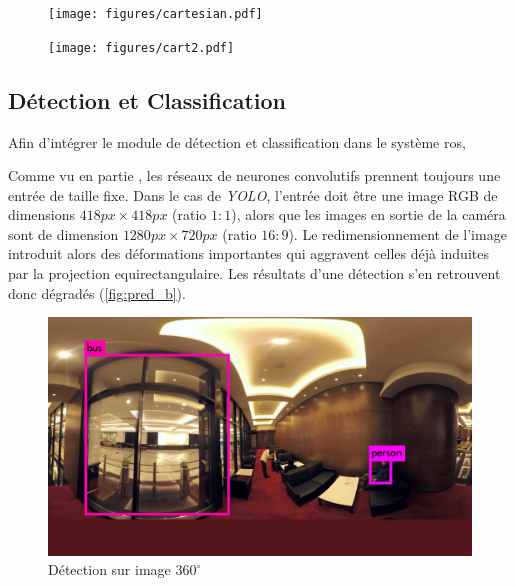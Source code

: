 			\begin{figure}[H]
				\centering
				\begin{minipage}{.5\textwidth}
					\centering
					\texttt{[image: figures/cartesian.pdf]}
					\label{fig:platlong}
				\end{minipage}%
				\begin{minipage}{.5\textwidth}
					\centering
					\texttt{[image: figures/cart2.pdf]}
					\label{fig:pequirect}
				\end{minipage}
			\end{figure}
			\par

		\subsection{Détection et Classification}
		
			Afin d'intégrer le module de détection et classification dans le système \gls{ros},
			\par
			
			Comme vu en partie \todoref, les réseaux de neurones convolutifs prennent toujours une entrée de taille fixe.
			Dans le cas de \emph{YOLO}, l'entrée doit être une image RGB de dimensions $ 418px \times 418px $ (ratio $1:1$), alors que les images en sortie de la caméra sont de dimension $ 1280px \times 720px$ (ratio $16:9$).
			Le redimensionnement de l'image introduit alors des déformations importantes qui aggravent celles déjà induites par la projection equirectangulaire.
			Les résultats d'une détection s'en retrouvent donc dégradés (\autoref{fig:pred_b}).
			\begin{figure}[H]
			{
				\centering
				\includegraphics[width=.8\textwidth]{figures/predictions_bad.jpg}
				\caption{Détection sur image $360^{\circ}$}
				\label{fig:pred_b}
			}
			\end{figure}
			
